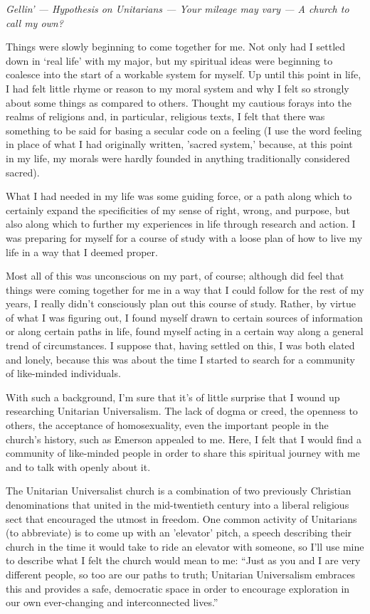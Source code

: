 \emph{Gellin' --- Hypothesis on Unitarians --- Your mileage may vary --- A church to call my own?}

Things were slowly beginning to come together for me. Not only had I settled down in `real life' with my major, but my spiritual ideas were beginning to coalesce into the start of a workable system for myself. Up until this point in life, I had felt little rhyme or reason to my moral system and why I felt so strongly about some things as compared to others. Thought my cautious forays into the realms of religions and, in particular, religious texts, I felt that there was something to be said for basing a secular code on a feeling (I use the word feeling in place of what I had originally written, 'sacred system,' because, at this point in my life, my morals were hardly founded in anything traditionally considered sacred).

What I had needed in my life was some guiding force, or a path along which to certainly expand the specificities of my sense of right, wrong, and purpose, but also along which to further my experiences in life through research and action. I was preparing for myself for a course of study with a loose plan of how to live my life in a way that I deemed proper.

Most all of this was unconscious on my part, of course; although did feel that things were coming together for me in a way that I could follow for the rest of my years, I really didn't consciously plan out this course of study. Rather, by virtue of what I was figuring out, I found myself drawn to certain sources of information or along certain paths in life, found myself acting in a certain way along a general trend of circumstances. I suppose that, having settled on this, I was both elated and lonely, because this was about the time I started to search for a community of like-minded individuals.

With such a background, I'm sure that it's of little surprise that I wound up researching Unitarian Universalism. The lack of dogma or creed, the openness to others, the acceptance of homosexuality, even the important people in the church's history, such as Emerson appealed to me. Here, I felt that I would find a community of like-minded people in order to share this spiritual journey with me and to talk with openly about it.

The Unitarian Universalist church is a combination of two previously Christian denominations that united in the mid-twentieth century into a liberal religious sect that encouraged the utmost in freedom. One common activity of Unitarians (to abbreviate) is to come up with an 'elevator' pitch, a speech describing their church in the time it would take to ride an elevator with someone, so I'll use mine to describe what I felt the church would mean to me: ``Just as you and I are very different people, so too are our paths to truth; Unitarian Universalism embraces this and provides a safe, democratic space in order to encourage exploration in our own ever-changing and interconnected lives.''

